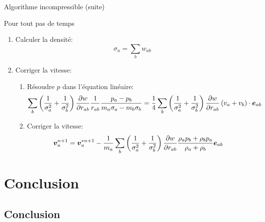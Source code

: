 \begin{frame}[<*>][shrink]{Algorithme incompressible (suite)}
\begin{block}{Pour tout pas de temps}
\begin{enumerate}
\begin{enumerate}
\begin{enumerate}
			\end{enumerate}
			\item Calculer la densité:
				\begin{equation*}
				\sigma_{a}=\sum_{b}w_{ab}
				\end{equation*}
			\item Corriger la vitesse:
			\begin{enumerate}
				\item Résoudre $p$ dans l'équation linéaire:
				\begin{equation*}
				\sum_{b}\left(\frac{1}{\sigma_{a}^2}+\frac{1}{\sigma_{b}^2}\right)\frac{\partial w}{\partial r_{ab}}\frac{1}{r_{ab}}\frac{p_a-p_b}{m_a\sigma_{a}-m_{b}\sigma_{b}} =\frac{1}{4}\sum_{b}\left(\frac{1}{\sigma_{a}^2}+\frac{1}{\sigma_{b}^2}\right)\frac{\partial w}{\partial r_{ab}}\left(v_{a}+v_b\right)\cdot {\boldsymbol {e}}_{ab}
				\end{equation*}
				\item Corriger la vitesse:
				\begin{equation*}
				{\boldsymbol {v}}^{n+1}_{a}={\boldsymbol {v}}^{*n+1}_{a}-\frac{1}{m_a}\sum_{b}\left(\frac{1}{\sigma_{a}^2}+\frac{1}{\sigma_{b}^2}\right)\frac{\partial w}{\partial r_{ab}}\frac{\rho_{a}p_{b}+\rho_{b}p_{a}}{\rho_a+\rho_b}{\boldsymbol {e}}_{ab}
				\end{equation*}
			\end{enumerate}
		\end{enumerate}
	\end{enumerate}
\end{block}
 \end{frame}

 \section{Conclusion}
 \subsection{Conclusion}


